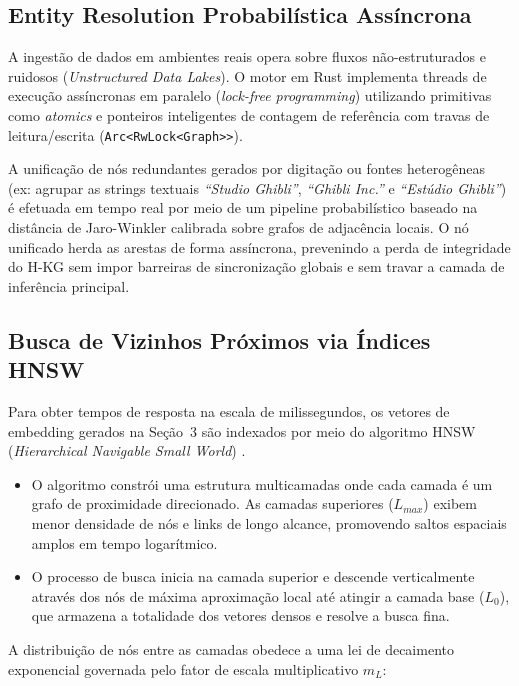 \documentclass[11pt,a4paper]{article}
\begin{document}
\subsection{Entity Resolution Probabilística Assíncrona}

A ingestão de dados em ambientes reais opera sobre fluxos não-estruturados e ruidosos
(\textit{Unstructured Data Lakes}). O motor em Rust implementa threads de execução assíncronas em
paralelo (\textit{lock-free programming}) utilizando primitivas como \textit{atomics} e ponteiros
inteligentes de contagem de referência com travas de leitura/escrita
(\texttt{Arc<RwLock<Graph>{}>}).

A unificação de nós redundantes gerados por digitação ou fontes heterogêneas (ex: agrupar as
strings textuais \textit{``Studio Ghibli''}, \textit{``Ghibli Inc.''} e
\textit{``Estúdio Ghibli''}) é efetuada em tempo real por meio de um pipeline probabilístico
baseado na distância de Jaro-Winkler calibrada sobre grafos de adjacência locais. O nó unificado
herda as arestas de forma assíncrona, prevenindo a perda de integridade do H-KG sem impor
barreiras de sincronização globais e sem travar a camada de inferência principal.

\subsection{Busca de Vizinhos Próximos via Índices HNSW}

Para obter tempos de resposta na escala de milissegundos, os vetores de embedding gerados na
Seção~3 são indexados por meio do algoritmo HNSW (\textit{Hierarchical Navigable Small World})
\cite{hnsw}.

\begin{itemize}
    \item O algoritmo constrói uma estrutura multicamadas onde cada camada é um grafo de
          proximidade direcionado. As camadas superiores ($L_{max}$) exibem menor densidade de
          nós e links de longo alcance, promovendo saltos espaciais amplos em tempo logarítmico.
    \item O processo de busca inicia na camada superior e descende verticalmente através dos nós
          de máxima aproximação local até atingir a camada base ($L_0$), que armazena a
          totalidade dos vetores densos e resolve a busca fina.
\end{itemize}

A distribuição de nós entre as camadas obedece a uma lei de decaimento exponencial governada pelo
fator de escala multiplicativo $m_L$:
\end{document}
